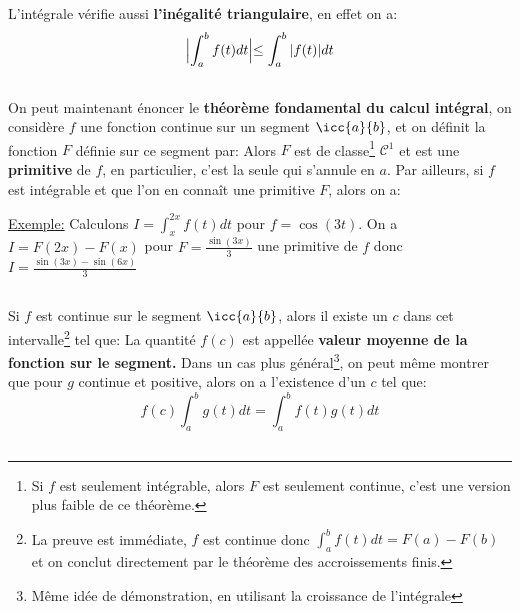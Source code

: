 L'intégrale vérifie aussi \textbf{l'inégalité triangulaire}, en effet on a:
\[ 
   \Bigl| \int_{a}^{b} f(t) d t \Bigl| \leq \int_{a}^{b} |f(t)| d t 
\]
  

\subsection*{}

On peut maintenant énoncer le \textbf{théorème fondamental du calcul intégral}, on considère \(f\) une fonction continue sur un segment \(\icc{a}{b}\), et on définit la fonction \(F\) définie sur ce segment par:
Alors \(F\) est de classe\footnote[4]{Si \(f\) est seulement intégrable, alors \(F\) est seulement continue, c'est une version plus faible de ce théorème.} \(\mathscr{C}^1\) et est une \textbf{primitive} de \(f\), en particulier, c'est la seule qui s'annule en \(a\).\+
Par ailleurs, si \(f\) est intégrable et que l'on en connaît une primitive \(F\), alors on a:

\underline{Exemple:} Calculons \(I = \int_{x}^{2x} f(t) d t\) pour \(f = \cos(3t)\). On a \(I = F(2x) - F(x)\) pour \(F = \frac{\sin(3x)}{3}\) une primitive de \(f\) donc \(I = \frac{\sin(3x) - \sin(6x)}{3}\)

\subsection*{}
Si \(f\) est continue sur le segment \(\icc{a}{b}\), alors il existe un \(c\) dans cet intervalle\footnote[1]{La preuve est immédiate, \(f\) est continue donc \(\int_{a}^{b} f(t) d t = F(a) - F(b)\) et on conclut directement par le théorème des accroissements finis.} tel que:
La quantité \(f(c)\) est appellée \textbf{valeur moyenne de la fonction sur le segment.}
Dans un cas plus général\footnote[2]{Même idée de démonstration, en utilisant la croissance de l'intégrale}, on peut même montrer que pour \(g\) continue et positive, alors on a l'existence d'un \(c\) tel que:
\[
   f(c)\int_{a}^{b} g(t) d t = \int_{a}^{b} f(t)g(t) d t
\]

\subsection*{}

